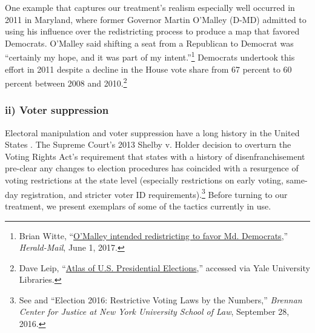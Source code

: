 \documentclass[12pt]{article}
\begin{document}
One example that captures our treatment's realism especially well occurred in 2011 in Maryland, where former Governor Martin O'Malley (D-MD) admitted to using his influence over the redistricting process to produce a map that favored Democrats. O'Malley said shifting a seat from a Republican to Democrat was ``certainly my hope, and it was part of my intent.''\footnote{Brian Witte, ``\href{https://www.heraldmailmedia.com/news/annapolis/o-malley-intended-redistricting-map-to-favor-md-democrats/article\_b368d498-797d-5c1a-9cba-7fb707ab737b.html}{O'Malley intended redistricting to favor Md. Democrats},'' \emph{Herald-Mail}, June 1, 2017.} Democrats undertook this effort in 2011 despite a decline in the House vote share from 67 percent to 60 percent between 2008 and 2010.\footnote{Dave Leip, ``\href{https://uselectionatlas.org/}{Atlas of U.S. Presidential Elections},'' accessed via Yale University Libraries.}

\subsubsection*{ii) Voter suppression}

Electoral manipulation and voter suppression have a long history in the United States \citep{Campbell2005,Bateman2018,Keyssar2000}. The Supreme Court's 2013 Shelby v. Holder decision to overturn the Voting Rights Act's requirement that states with a history of disenfranchisement pre-clear any changes to election procedures has coincided with a resurgence of voting restrictions at the state level (especially restrictions on early voting, same-day registration, and stricter voter ID requirements).\footnote{See \citet{BergmanTranYates2018} and ``Election 2016: Restrictive Voting Laws by the Numbers,'' \emph{Brennan Center for Justice at New York University School of Law}, September 28, 2016.} Before turning to our treatment, we present exemplars of some of the tactics currently in use.
\end{document}
